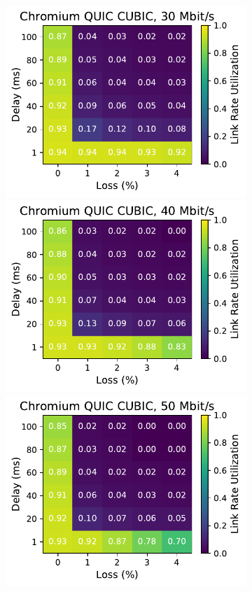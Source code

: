 \begin{figure}[ht]
\begin{subfigure}[b]{0.22\linewidth}
        \includegraphics[width=\linewidth,trim={0 0 2cm 0},clip]{figures/heatmaps/heatmap_quic_cubic_30mbps.pdf}
        \includegraphics[width=\linewidth,trim={0 0 2cm 0},clip]{figures/heatmaps/heatmap_quic_cubic_40mbps.pdf}
        \includegraphics[width=\linewidth,trim={0 0 2cm 0},clip]{figures/heatmaps/heatmap_quic_cubic_50mbps.pdf}

\end{subfigure}
\end{figure}
